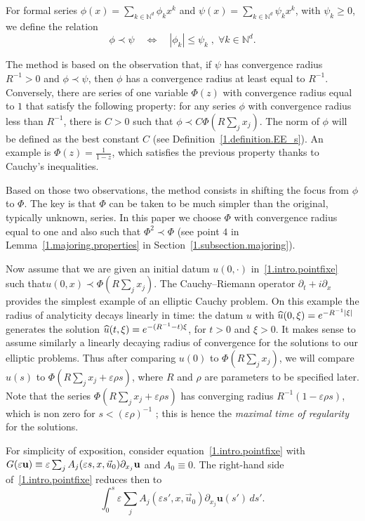 \documentclass[AHL,Unicode,longabstracts,published]{cedram}
\theoremstyle{plain}
\newcommand*\e{\varepsilon}
\newcommand*\N{{\mathbb N}}
\newcommand{\dptl}{\partial}%
\newcommand{\ubf}{{\mathbf u}}
\renewcommand*{\hat}[1]{\mathchoice{\widehat{#1}}{\widehat{#1}}{\oldhat{#1}}{\oldhat{#1}}}\let\oldforall\forall
\renewcommand*{\forall}{\mathrel{\oldforall}}
\begin{document}
For formal series $\phi(x) = \sum_{k\in\N^{d}} \phi_{k} x^{k}$ and $\psi(x) = \sum_{k\in\N^{d}} \psi_{k} x^{k}$, with $\psi_{k} \geq 0$, we define the relation
\[
\phi \prec \psi \quad \Longleftrightarrow \quad |\phi_{k}| \leq \psi_k \;, \; \forall k \in \N^{d}.
\]

The method is based on the observation that, if $\psi$ has convergence radius $R^{-1} >0$ and $\phi \prec \psi$, then $\phi$ has a convergence radius at least equal to $R^{-1}$. Conversely, there are series of one variable $\Phi(z)$ with convergence radius equal to $1$ that satisfy the following property: for any series $\phi$ with convergence radius less than $R^{-1}$, there is $C>0$ such that $\phi \prec C \Phi(R \sum_j x_j)$. The norm of $\phi$ will be defined as the best constant $C$ (see Definition~\ref{1.definition.EE_s}). An example is $\Phi(z) = \frac{1}{1 - z}$, which satisfies the previous property thanks to Cauchy's inequalities.

Based on those two observations, the method consists in shifting the focus from $\phi$ to $\Phi$. The key is that $\Phi$ can be taken to be much simpler than the original, typically unknown, series. In this paper we choose $\Phi$ with convergence radius equal to one and also such that $\Phi^2 \prec \Phi$ (see point $4$ in Lemma~\ref{1.majoring.properties} in Section~\ref{1.subsection.majoring}).

Now assume that we are given an initial datum $u(0,\cdot)$ in~\eqref{1.intro.pointfixe} such that\linebreak$u(0,x)\prec \Phi(R \sum_j x_j)$. The Cauchy--Riemann operator $\dptl_t + i\dptl_x$ provides the simplest example of an elliptic Cauchy problem. On this example the radius of analyticity decays linearly in time: the datum $u$ with $\hat{u}(0,\xi) = e^{-R^{-1}|\xi|}$ generates the solution $\hat{u}(t,\xi) = e^{-(R^{-1}-t)\xi}$, for $t > 0$ and $\xi > 0$. It makes sense to assume similarly a linearly decaying radius of convergence for the solutions to our elliptic problems. Thus after comparing $u(0)$ to $\Phi(R \sum_j x_j)$, we will compare $u(s)$ to $\Phi(R \sum_j x_j + \e\rho s)$, where $R$ and $\rho$ are parameters to be specified later. Note that the series $\Phi(R \sum_j x_j + \e\rho s)$ has converging radius $R^{-1}(1 - \e \rho s)$, which is non zero for $s < (\e \rho)^{-1}$ ; this is hence the \emph{maximal time of regularity} for the solutions.

For simplicity of exposition, consider equation~\eqref{1.intro.pointfixe} with $G(\e\ubf) \equiv \e \sum_j A_j(\e s,x,\vec{u}_0)\linebreak\dptl_{x_j}\ubf$ and $A_0 \equiv 0$. The right-hand side of~\eqref{1.intro.pointfixe} reduces then to
\begin{equation}\label{1.intro.def.rhs}
\int_{0}^{s} \e \sum_j A_j(\e s',x, \vec{u}_0)\dptl_{x_j} \ubf(s') \,ds'.
\end{equation}
\end{document}
